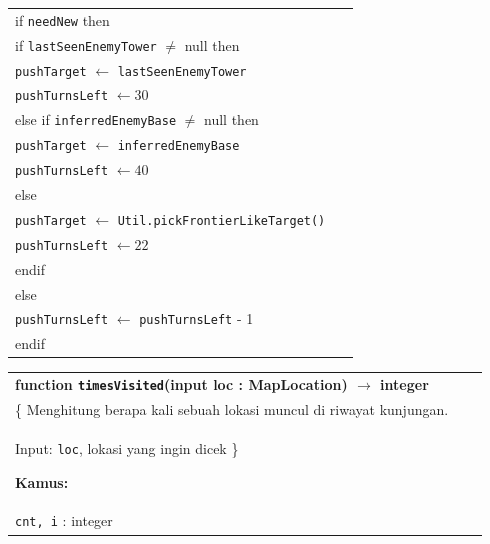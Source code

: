 \documentclass{article}
\newenvironment{pseudobox}
{
\centering
\begin{longtable}{|p{0.94\linewidth}|}
\hline
}
{
\\ \hline
\end{longtable}
\vspace{0.05cm}
}
\begin{document}
\begin{enumerate}[label=\alph*.]
\begin{enumerate}[label=\alph*.]
\begin{pseudobox}
\hspace*{1.5em}if \texttt{needNew} then \\
\hspace*{3em}if \texttt{lastSeenEnemyTower} $\neq$ null then \\
\hspace*{4.5em}\texttt{pushTarget} $\leftarrow$ \texttt{lastSeenEnemyTower} \\
\hspace*{4.5em}\texttt{pushTurnsLeft} $\leftarrow 30$ \\
\hspace*{3em}else if \texttt{inferredEnemyBase} $\neq$ null then \\
\hspace*{4.5em}\texttt{pushTarget} $\leftarrow$ \texttt{inferredEnemyBase} \\
\hspace*{4.5em}\texttt{pushTurnsLeft} $\leftarrow 40$ \\
\hspace*{3em}else \\
\hspace*{4.5em}\texttt{pushTarget} $\leftarrow$ \texttt{Util.pickFrontierLikeTarget()} \\
\hspace*{4.5em}\texttt{pushTurnsLeft} $\leftarrow 22$ \\
\hspace*{3em}endif \\
\hspace*{1.5em}else \\
\hspace*{3em}\texttt{pushTurnsLeft} $\leftarrow$ \texttt{pushTurnsLeft} - 1 \\
\hspace*{1.5em}endif
\end{pseudobox}

\begin{pseudobox}
\textbf{function \texttt{timesVisited}(input loc : MapLocation) $\rightarrow$ integer} \\
\{ Menghitung berapa kali sebuah lokasi muncul di riwayat kunjungan. \\
Input: \texttt{loc}, lokasi yang ingin dicek
\}

\textbf{Kamus:} \\
\hspace*{1.5em}\texttt{cnt, i} : integer


\end{pseudobox}
\end{enumerate}
\end{enumerate}
\end{document}
